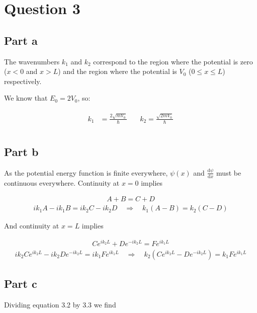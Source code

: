 \documentclass[paper=a4, fontsize=11pt]{scrartcl} %
\numberwithin{equation}{section} %
\numberwithin{figure}{section} %
\numberwithin{table}{section} %
\begin{document}
\section{Question 3}
\subsection{Part a}
The wavenumbers $k_1$ and $k_2$ correspond to the region where the potential is zero ($x<0$ and $x>L$) and the region where the potential is $V_0$ ($0\leq x \leq L$) respectively.

We know that $E_0 = 2V_0$, so:

\begin{align}
\begin{split}
k_1 &=\frac{2\sqrt{mV_0}}{\hbar} \\
\end{split}
\quad
\begin{split}
k_2 = \frac{\sqrt{2mV_0}}{\hbar} \\
\end{split}
\end{align}

\subsection{Part b}
As the potential energy function is finite everywhere, $\psi(x)$ and $\frac{\mathrm{d}\psi}{\mathrm{d}x}$ must be continuous everywhere. Continuity at $x=0$ implies

\begin{align}
A+B=C+D
\end{align}
\begin{align}
ik_1A-ik_1B=ik_2C-ik_2D \quad \Rightarrow \quad
k_1(A-B) = k_2(C-D)
\end{align}

And continuity at $x=L$ implies

\begin{align}
Ce^{ik_2L}+De^{-ik_2L} = Fe^{ik_1L}
\end{align}
\begin{align}
ik_2Ce^{ik_2L}-ik_2De^{-ik_2L} = ik_1Fe^{ik_1L} \quad
\Rightarrow \quad k_2\left(Ce^{ik_2L}-De^{-ik_2L}\right)
=k_1Fe^{ik_1L}
\end{align}

\subsection{Part c}
Dividing equation 3.2 by 3.3 we find
\end{document}
